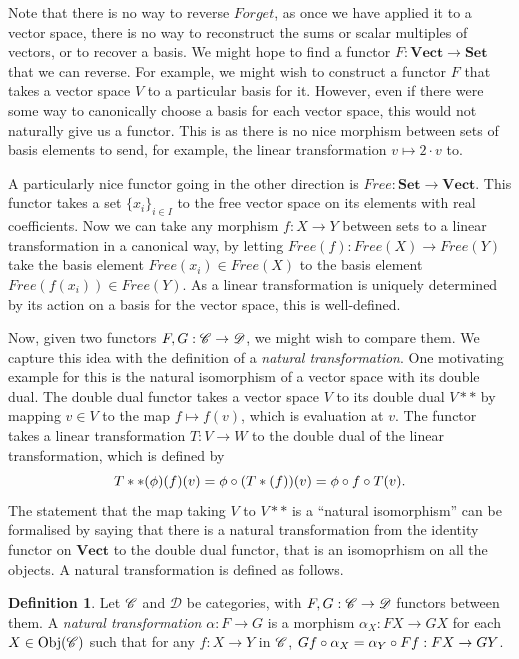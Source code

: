 \documentclass[a4paper,12pt,leqno]{article} \usepackage{amsmath}
\newcommand{\curD}{\mathscr{D}} \newcommand{\curI}{\mathscr{I}}
\newcommand{\Obj}{\ensuremath{\operatorname{Obj}}}
\theoremstyle{definition}
\newtheorem{defn}{Definition}
\begin{document}
Note that there is no way to reverse $Forget$, as once we have applied it to
a vector space, there is no way to reconstruct the sums or scalar multiples of
vectors, or to recover a basis.
We might hope to find a functor $F: \textbf{Vect}\to\textbf{Set}$ that we can
reverse.
For example, we might wish to construct a functor $F$ that takes a vector space
$V$ to a particular basis for it.
However, even if there were some way to canonically choose a basis for each
vector space, this would not naturally give us a functor.
This is as there is no nice morphism between sets of basis elements to send,
for example, the linear transformation $v\mapsto 2\cdot v$ to.

A particularly nice functor going in the other direction is $Free:
\textbf{Set}\to \textbf{Vect}$.
This functor takes a set $\{x_i\}_{i\in I}$ to the free vector space on its
elements with real coefficients.
Now we can take any morphism $f: X\to Y$ between sets to a linear
transformation in a canonical way, by letting $Free(f): Free(X)\to Free(Y)$
take the basis element $Free(x_i)\in Free(X)$ to the basis element
$Free(f(x_i))\in Free(Y)$.
As a linear transformation is uniquely determined by its action on a basis for
the vector space, this is well-defined.

Now, given two functors $F, G: \curC\to\curD$, we might wish to compare them.
We capture this idea with the definition of a \emph{natural transformation}.
One motivating example for this is the natural isomorphism of a vector space
with its double dual.
The double dual functor takes a vector space $V$ to its double dual $V**$ by
mapping $v\in V$ to the map $f\mapsto f(v)$, which is evaluation at $v$.
The functor takes a linear transformation $T: V\to W$ to the double dual of the
linear transformation, which is defined by
$$T**(\phi)(f)(v) = \phi\circ (T*(f))(v) = \phi\circ f\circ T(v).$$
The statement that the map taking $V$ to $V**$ is a ``natural isomorphism'' can
be formalised by saying that there is a natural transformation from
the identity functor on $\textbf{Vect}$ to the double dual functor, that is an
isomoprhism on all the objects.
A natural transformation is defined as follows.

\begin{defn}
  Let $\mathscr{C}$ and $\curD$ be categories, with $F, G: \curC\to \curD$ functors
  between them.
  A \emph{natural transformation} $\alpha: F\to G$ is a morphism
  $\alpha_X: FX\to GX$ for each $X\in \Obj(\curC)$ such that for any
  $f: X\to Y$ in $\mathscr{C}$, $Gf\circ \alpha_X = \alpha_Y\circ Ff: FX\to GY$.
\end{defn}
\end{document}

